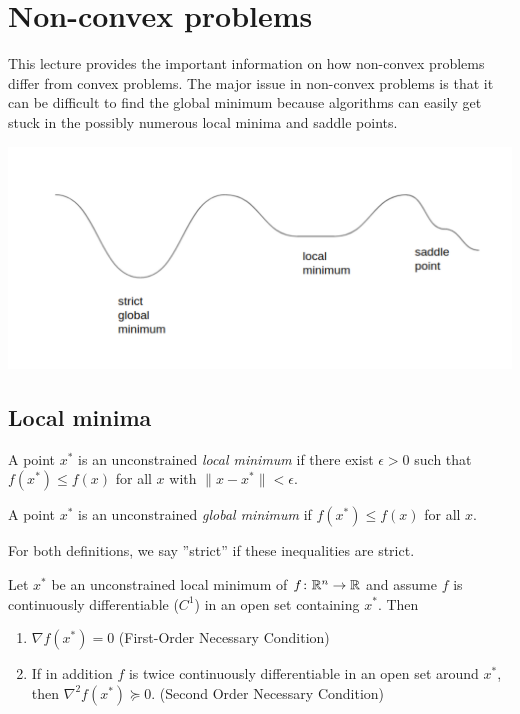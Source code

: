 \section{Non-convex problems}

This lecture provides the important information on how non-convex problems differ from convex problems. The major issue in non-convex problems is that it can be difficult to find the global minimum because algorithms can easily get stuck in the possibly numerous local minima and saddle points.

\begin{center}
\includegraphics[width=1.0\linewidth, height=0.4\linewidth]{figures/lecture_17_non_convex_graph.pdf} 
\end{center}

\subsection{Local minima}

\begin{definition}
A point $x^*$ is an unconstrained \textit{local minimum} if there exist $\epsilon > 0$ such that $f(x^*) \le f(x)$ for all $x$ with $\|x - x^*\| < \epsilon$.
\end{definition}

\begin{definition}
A point $x^*$ is an unconstrained \textit{global minimum} if $f(x^*) \le f(x)$ for all $x$.
\end{definition}

For both definitions, we say ''strict'' if these inequalities are strict.

\begin{proposition}
Let $x^*$ be an unconstrained local minimum of $f\colon \mathbb{R}^n \to\mathbb{R}$ and assume $f$ is continuously differentiable ($C^1$) in an open set containing $x^*$. Then
\begin{enumerate}
    \item $\nabla f(x^*) = 0$ (First-Order Necessary Condition)
    \item If in addition $f$ is twice continuously differentiable in an open set around $x^*$, then $\nabla^2f(x^*) \succeq 0$. (Second Order Necessary Condition)
\end{enumerate}
\end{proposition}

